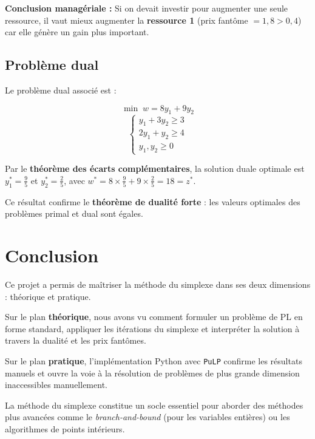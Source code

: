 \documentclass[12pt,a4paper]{article}
\begin{document}
\textbf{Conclusion managériale :} Si on devait investir pour augmenter 
une seule ressource, il vaut mieux augmenter la \textbf{ressource 1} 
(prix fantôme $= 1{,}8 > 0{,}4$) car elle génère un gain plus important.

\subsection{Problème dual}

Le problème dual associé est :

\[
  \min \; w = 8y_1 + 9y_2
\]
\[
  \begin{cases}
    y_1 + 3y_2 \geq 3 \\
    2y_1 + y_2 \geq 4 \\
    y_1, y_2 \geq 0
  \end{cases}
\]

Par le \textbf{théorème des écarts complémentaires}, la solution duale 
optimale est $y_1^* = \frac{9}{5}$ et $y_2^* = \frac{2}{5}$, 
avec $w^* = 8 \times \frac{9}{5} + 9 \times \frac{2}{5} = 18 = z^*$.

Ce résultat confirme le \textbf{théorème de dualité forte} : 
les valeurs optimales des problèmes primal et dual sont égales.

\section{Conclusion}

Ce projet a permis de maîtriser la méthode du simplexe dans ses deux 
dimensions : théorique et pratique.

Sur le plan \textbf{théorique}, nous avons vu comment formuler un 
problème de PL en forme standard, appliquer les itérations du simplexe 
et interpréter la solution à travers la dualité et les prix fantômes.

Sur le plan \textbf{pratique}, l'implémentation Python avec 
\texttt{PuLP} confirme les résultats manuels et ouvre la voie à la 
résolution de problèmes de plus grande dimension inaccessibles 
manuellement.

La méthode du simplexe constitue un socle essentiel pour aborder 
des méthodes plus avancées comme le \textit{branch-and-bound} 
(pour les variables entières) ou les algorithmes de points intérieurs.
\end{document}
